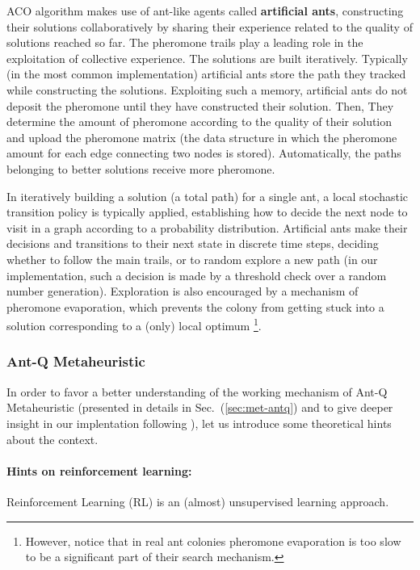 \documentclass[10pt]{article}
\begin{document}
ACO  algorithm  makes use  of ant-like agents called \textbf{artificial ants}, constructing their solutions collaboratively by sharing their experience related to the quality of solutions reached so far.
The pheromone trails play  a  leading  role  in  the  exploitation of collective experience.
The solutions are built iteratively.
Typically (in the most common implementation) artificial  ants  store  the  path  they  tracked while  constructing  the solutions.  
Exploiting such a memory, artificial  ants  do not deposit  the pheromone until they have constructed their solution. 
Then, They determine the amount of pheromone according  to  the  quality  of  their  solution  and upload the pheromone matrix (the data structure in which the pheromone amount for each edge connecting two nodes is stored). 
Automatically, the paths belonging to better solutions receive  more pheromone.

In iteratively building a solution (a total path) for a single ant, a local stochastic  transition policy is typically applied, establishing how to decide the next node to visit in a graph according to a probability distribution. Artificial  ants  make  their  decisions  and  transitions  to  their  next  state  in  discrete  time steps, deciding whether to follow the main trails, or to random explore a new path (in our implementation, such a decision is made by a threshold check over a random number generation).
Exploration is also encouraged  by a mechanism of  pheromone  evaporation, which prevents the  colony from  getting stuck into a solution corresponding to a (only) local optimum \footnote{However, notice that in real ant colonies pheromone evaporation is too slow to be a significant part of their search mechanism.}.

\subsubsection{Ant-Q Metaheuristic}\label{sec:antq}
In order to favor a better understanding of the working mechanism of Ant-Q Metaheuristic (presented in details in Sec.~(\ref{sec:met-antq}) and to give deeper insight in our implentation following \cite{undici} ), let us introduce some theoretical hints about the context.
\paragraph{Hints on reinforcement learning:}
Reinforcement  Learning  (RL)  is  an  (almost) unsupervised  learning  approach.
\end{document}
